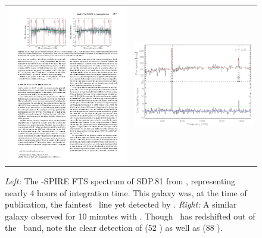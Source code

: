 \begin{figure}[h]
  \begin{tabular}{ll}
    \begin{minipage}{3.25in}
      \begin{center}
	\includegraphics[width=3.25in]{valtchanov11_sdp81_spire_fts_spectrum.pdf}
      \end{center}
    \end{minipage} &
    \begin{minipage}{3.25in}
      \begin{center}
	\includegraphics[width=3.25in]{simgal_z300.pdf}
      \end{center}
    \end{minipage} 
  \end{tabular}
    \caption {\small {\it Left:} The \herschel-SPIRE FTS spectrum of SDP.81 from \citet{valtchanov11}, representing nearly 4 hours of integration time.  This galaxy was, at the time of publication, the faintest \cii\ line yet detected by \herschel.  {\it Right:} A similar galaxy observed for 10 minutes with \name.  Though \cii\ has redshifted out of the \name\ band, note the clear detection of \oiii (52 \mum) as well as \oiii (88 \mum).}
\end{figure}


